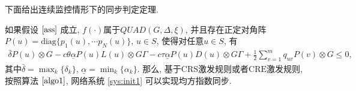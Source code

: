        下面给出连续监控情形下的同步判定定理.
        \begin{thm}\label{themcon}
            如果假设 $\ref{ass}$ 成立, $f(\cdot)$属于$QUAD(G,\Delta,\xi)$, 并且存在正定对角阵$P(u)=\mathrm{diag}\{p_{1}(u),\cdots p_{N}(u)\}$, $u\in S$, 使得对任意$u\in S$, 有
            \begin{align}\label{nonthm:1}
            \bar{\delta}P(u)\otimes G-c\theta\underline{\alpha} P(u)L(u)\otimes G\Gamma
            -c\tau\underline{\alpha} P(u)D(u)\otimes G\Gamma+\frac{1}{2}\sum_{v=1}^{m}q_{uv}P(v)\otimes G\leq 0,
            \end{align}
            其中$\bar{\delta}=\max_{k}\{\delta_k \}$, $\underline{\alpha}=\min_{k}\{\alpha_{k}\}$.
            那么, 基于$\mathrm{CRS}$激发规则或者$\mathrm{CRE}$激发规则, 按照算法 $\ref{algo1}$, 网络系统 \eqref{sys:init1} 可以实现均方指数同步.
        \end{thm}
